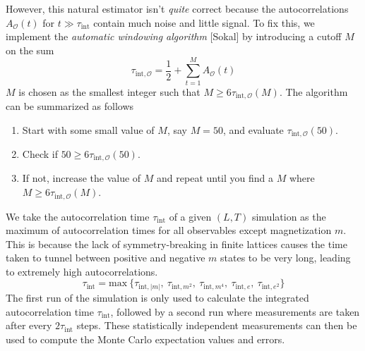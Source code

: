 \documentclass[../journal_main.tex]{subfiles}
\begin{document}
However, this natural estimator isn't \textit{quite} correct because the autocorrelations $A_\mathcal{O}(t)$ for $t \gg \tau_\text{int}$ contain much noise and little signal. To fix this, we implement the \textit{automatic windowing algorithm} [Sokal] by introducing a cutoff $M$ on the sum
\begin{equation}
    \tau_{\text{int}, \mathcal{O}} = \frac{1}{2} + \sum_{t=1}^{M} A_\mathcal{O}(t)
\end{equation} 
$M$ is chosen as the smallest integer such that $M \geq 6 \tau_{\text{int}, \mathcal{O}}(M)$. The algorithm can be summarized as follows  
\begin{enumerate}
    \setlength{\itemsep}{0.1em}
    \item Start with some small value of $M$, say $M=50$, and evaluate $\tau _{\text{int}, \mathcal{O}}(50)$.
    \item Check if $50 \geq 6\tau _{\text{int}, \mathcal{O}}(50)$.
    \item If not, increase the value of $M$ and repeat until you find a $M$ where $M \geq 6 \tau_{\text{int}, \mathcal{O}}(M)$.           
\end{enumerate}   
We take the autocorrelation time $\tau_\text{int}$ of a given $(L, T)$ simulation as the maximum of autocorrelation times for all observables except magnetization $m$. This is because the lack of symmetry-breaking in finite lattices causes the time taken to tunnel between positive and negative $m$ states to be very long, leading to extremely high autocorrelations. 
\begin{equation}
    \tau _\text{int} = \text{max}\:\{\tau_{\text{int},|m|},\: \tau_{\text{int}, m^2},\: \tau_{\text{int}, m^4},\: \tau_{\text{int}, e},\: \tau_{\text{int}, e^2}\}
\end{equation}
The first run of the simulation is only used to calculate the integrated autocorrelation time $\tau_\text{int}$, followed by a second run where measurements are taken after every $2 \tau_\text{int}$ steps. These statistically independent measurements can then be used to compute the Monte Carlo expectation values and errors.
\end{document}
